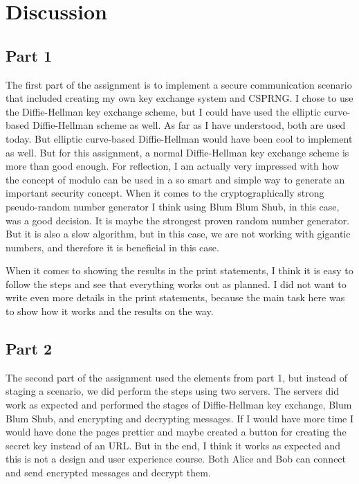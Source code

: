 \documentclass[12pt, letterpaper]{article}
\begin{document}
\section*{Discussion}

\subsection*{Part 1}
The first part of the assignment is to implement a secure communication scenario that included creating my own key exchange system and CSPRNG. I chose to use the Diffie-Hellman key exchange scheme, but I could have used the elliptic curve-based Diffie-Hellman scheme as well. As far as I have understood, both are used today. But elliptic curve-based Diffie-Hellman would have been cool to implement as well. But for this assignment, a normal Diffie-Hellman key exchange scheme is more than good enough. For reflection, I am actually very impressed with how the concept of modulo can be used in a so smart and simple way to generate an important security concept. When it comes to the cryptographically strong pseudo-random number generator I think using Blum Blum Shub, in this case, was a good decision. It is maybe the strongest proven random number generator. But it is also a slow algorithm, but in this case, we are not working with gigantic numbers, and therefore it is beneficial in this case.

When it comes to showing the results in the print statements, I think it is easy to follow the steps and see that everything works out as planned. I did not want to write even more details in the print statements, because the main task here was to show how it works and the results on the way. 

\subsection*{Part 2}
The second part of the assignment used the elements from part 1, but instead of staging a scenario, we did perform the steps using two servers. The servers did work as expected and performed the stages of Diffie-Hellman key exchange, Blum Blum Shub, and encrypting and decrypting messages. If I would have more time I would have done the pages prettier and maybe created a button for creating the secret key instead of an URL. But in the end, I think it works as expected and this is not a design and user experience course. Both Alice and Bob can connect and send encrypted messages and decrypt them.
\end{document}
